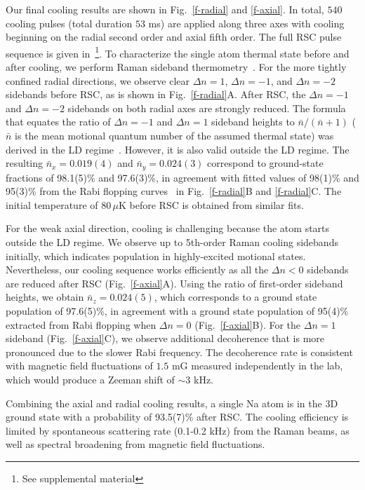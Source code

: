 \documentclass[aps,prl,twocolumn,groupedaddress]{revtex4-1}
\begin{document}
Our final cooling results are shown in Fig.~\ref{f-radial} and \ref{f-axial}.
In total, $540$ cooling pulses (total duration $53$ ms) are applied
along three axes with cooling beginning on the radial second order and axial fifth order.
The full RSC pulse sequence is given in~\footnote{See supplemental material}.
To characterize the single atom thermal state before and after cooling,
we perform Raman sideband thermometry~\cite{Monroe1995, Meekhof1996}.
For the more tightly confined radial directions,
we observe clear $\Delta n=1$, $\Delta n=-1$, and $\Delta n=-2$ sidebands before RSC,
as is shown in Fig.~\ref{f-radial}A.
After RSC, the $\Delta n=-1$ and $\Delta n=-2$ sidebands on both radial axes are strongly reduced.
The formula that equates the ratio of $\Delta n=-1$ and $\Delta n=1$ sideband heights to
$\bar{n}/(\bar{n}+1)$ ($\bar{n}$ is the mean motional quantum number of the assumed thermal state)
was derived in the LD regime~\cite{Monroe1995}.
However, it is also valid outside the LD regime.
The resulting $\bar{n}_x=0.019(4)$ and $\bar{n}_y=0.024(3)$ correspond to
ground-state fractions of 98.1(5)\% and 97.6(3)\%,
in agreement with fitted values of 98(1)\% and 95(3)\%
from the Rabi flopping curves~\cite{Meekhof1996} in Fig.~\ref{f-radial}B and \ref{f-radial}C.
The initial temperature of $80\,\mu$K before RSC is obtained from similar fits.

For the weak axial direction, cooling is challenging because the atom starts outside the LD regime.
We observe up to 5th-order Raman cooling sidebands initially,
which indicates population in highly-excited motional states.
Nevertheless, our cooling sequence works efficiently as all the $\Delta n<0$ sidebands are reduced
after RSC (Fig.~\ref{f-axial}A).
Using the ratio of first-order sideband heights, we obtain $\bar{n}_z=0.024(5)$,
which corresponds to a ground state population of
97.6(5)\%, in agreement with a ground state population of 95(4)\% extracted from Rabi flopping
when $\Delta n=0$ (Fig.~\ref{f-axial}B).
For the $\Delta n=1$ sideband (Fig.~\ref{f-axial}C),
we observe additional decoherence that is more pronounced due to the slower Rabi frequency.
The decoherence rate is consistent with magnetic field fluctuations of $1.5$ mG
measured independently in the lab, which would produce a Zeeman shift of $\sim 3$ kHz.

Combining the axial and radial cooling results,
a single Na atom is in the 3D ground state with a probability of 93.5(7)\% after RSC.
The cooling efficiency is limited by spontaneous scattering rate
(0.1-0.2 kHz) from the Raman beams,
as well as spectral broadening from magnetic field fluctuations.
\end{document}
